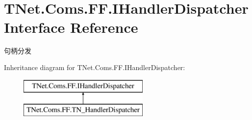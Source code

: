 \hypertarget{interface_t_net_1_1_coms_1_1_f_f_1_1_i_handler_dispatcher}{}\section{T\+Net.\+Coms.\+F\+F.\+I\+Handler\+Dispatcher Interface Reference}
\label{interface_t_net_1_1_coms_1_1_f_f_1_1_i_handler_dispatcher}


句柄分发  


Inheritance diagram for T\+Net.\+Coms.\+F\+F.\+I\+Handler\+Dispatcher\+:\begin{figure}[H]
\begin{center}
\leavevmode
\includegraphics[height=2.000000cm]{interface_t_net_1_1_coms_1_1_f_f_1_1_i_handler_dispatcher}
\end{center}
\end{figure}
